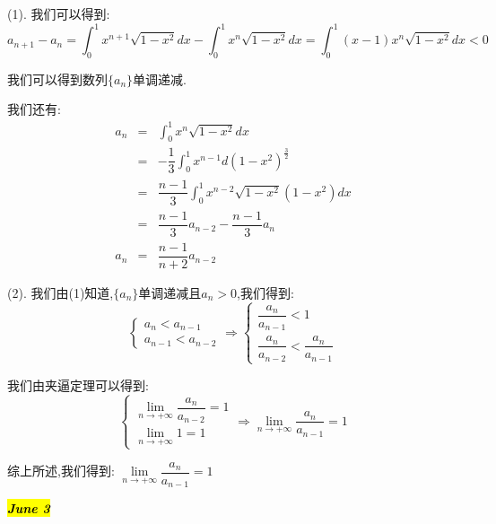 \begin{anymark}[注]
	(1). 我们可以得到: 
	$$a_{n+1}-a_{n}=\int_{0}^{1}x^{n+1}\sqrt{1-x^2}dx-\int_{0}^{1}x^{n}\sqrt{1-x^2}dx=\int_{0}^{1}(x-1)x^{n}\sqrt{1-x^2}dx<0$$
	
	我们可以得到数列$\{a_{n}\}$单调递减.
	
	我们还有: 
	\begin{eqnarray*}
		a_{n}&=&\int_{0}^{1}x^{n}\sqrt{1-x^2}dx\\
		&=&-\dfrac{1}{3}\int_{0}^{1}x^{n-1}d(1-x^2)^{\frac{3}{2}}\\
		&=&\dfrac{n-1}{3}\int_{0}^{1}x^{n-2}\sqrt{1-x^2}(1-x^2)dx\\
		&=&\dfrac{n-1}{3}a_{n-2}-\dfrac{n-1}{3}a_{n}\\
		a_{n}&=&\dfrac{n-1}{n+2}a_{n-2}
	\end{eqnarray*}
	
	(2). 我们由(1)知道,$\{a_{n}\}$单调递减且$a_{n}>0$,我们得到: 
	$$\left\lbrace
	\begin{array}{l}
		a_{n}<a_{n-1}\\a_{n-1}<a_{n-2}
	\end{array}
	\right. \Rightarrow \left\lbrace
	\begin{array}{l}
		\dfrac{a_{n}}{a_{n-1}}<1\\\dfrac{a_{n}}{a_{n-2}}<\dfrac{a_{n}}{a_{n-1}}
	\end{array}
	\right. $$
	
	我们由夹逼定理可以得到: 
	$$\left\lbrace
	\begin{array}{l}
		\lim\limits_{n\rightarrow +\infty}\dfrac{a_{n}}{a_{n-2}}=1\\
		\lim\limits_{n\rightarrow +\infty}1=1
	\end{array}
	\right. \Rightarrow \lim\limits_{n\rightarrow +\infty}\dfrac{a_{n}}{a_{n-1}}=1$$
	
	综上所述,我们得到: $\lim\limits_{n\rightarrow +\infty}\dfrac{a_{n}}{a_{n-1}}=1$
\end{anymark}

\hl{\textbf{\textit{June 3}}}

